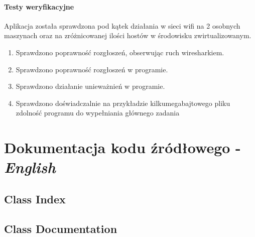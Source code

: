 \documentclass[11pt,oneside]{book}
\newcommand{\+}{\discretionary{\mbox{\scriptsize$\hookleftarrow$}}{}{}}
\begin{document}
\subsection{Testy weryfikacyjne}
Aplikacja została sprawdzona pod kątek działania w sieci wifi na 2 osobnych maszynach oraz na zróżnicowanej ilości hostów w środowisku zwirtualizowanym.
\begin{enumerate}
	\item Sprawdzono poprawność rozgłoszeń, obserwując ruch wiresharkiem.
	\item Sprawdzono poprawność rozgłoszeń w programie.
	\item Sprawdzono działanie unieważnień w programie.
	\item Sprawdzono doświadczalnie na przykładzie kilkumegabajtowego pliku zdolność programu do wypełniania głównego zadania
\end{enumerate}

\part{Dokumentacja kodu źródłowego - \textit{English}}
\chapter{Class Index}

\chapter{Class Documentation}


















\end{document}
